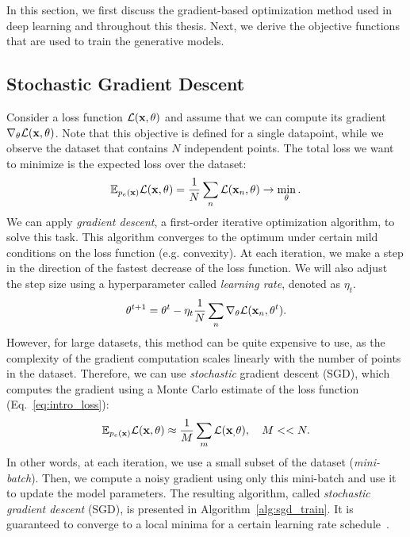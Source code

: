 In this section, we first discuss the gradient-based optimization method used in deep learning and throughout this thesis. 
Next, we derive the objective functions that are used to train the generative models.

\subsection{Stochastic Gradient Descent}
Consider a loss function $\mathcal{L}({\mathbf{x}}, \theta)$ and assume that we can compute its gradient $\nabla_\theta \mathcal{L}({\mathbf{x}}, \theta)$. Note that this objective is defined for a single datapoint, while we observe the dataset that contains $N$ independent points. 
The total loss we want to minimize is the expected loss over the dataset:
\begin{equation}\label{eq:intro_loss}
\E_{p_e(\rvx)} \mathcal{L}(\rvx, \theta) = \frac1N \sum_n \mathcal{L}(\rvx_n, \theta) \rightarrow \min_{\theta}.
\end{equation}
We can apply \textit{gradient descent}, a first-order iterative optimization algorithm, to solve this task. This algorithm converges to the optimum under certain mild conditions on the loss function (e.g. convexity). At each iteration, we make a step in the direction of the fastest decrease of the loss function. We will also adjust the step size using a hyperparameter called \textit{learning rate}, denoted as $\eta_t$.
\begin{equation}\label{eq:intro_gd}
    \theta^{t+1} = \theta^{t} - \eta_{t} \frac1N \sum_n \nabla_{\theta}\mathcal{L}(\rvx_n, \theta^{t}).
\end{equation}
However, for large datasets, this method can be quite expensive to use, as the complexity of the gradient computation scales linearly with the number of points in the dataset. 
Therefore, we can use \textit{stochastic} gradient descent (SGD), which computes the gradient using a Monte Carlo estimate of the loss function (Eq.~\ref{eq:intro_loss}):
\begin{equation}
\mathbb{E}_{p_e({\mathbf{x}})} \mathcal{L}({\mathbf{x}}, \theta) \approx \frac1M \sum_m \mathcal{L}({\mathbf{x}}_, \theta), \quad M << N.
\end{equation}
In other words, at each iteration, we use a small subset of the dataset (\textit{mini-batch}). Then, we compute a noisy gradient using only this mini-batch and use it to update the model parameters. The resulting algorithm, called \textit{stochastic gradient descent} (SGD), is presented in Algorithm~\ref{alg:sgd_train}. It is guaranteed to converge to a local minima for a certain learning rate schedule~\citep{robbins1951stochastic}.

